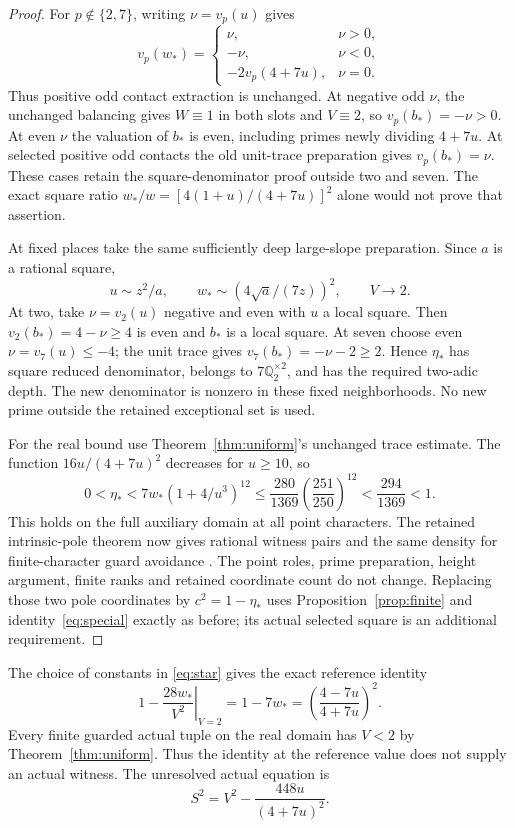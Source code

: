 \documentclass[11pt,a4paper]{article}
\newcommand{\Q}{\mathbb Q}
\begin{document}
\begin{proof}
For $p\notin\{2,7\}$, writing $\nu=v_p(u)$ gives
\[
 v_p(w_*)=\begin{cases}
 \nu,&\nu>0,\\ -\nu,&\nu<0,\\
 -2v_p(4+7u),&\nu=0.
 \end{cases}
\]
Thus positive odd contact extraction is unchanged. At negative odd
$\nu$, the unchanged balancing gives $W\equiv1$ in both slots
and $V\equiv2$, so $v_p(b_*)=-\nu>0$. At even $\nu$ the
valuation of $b_*$ is even, including primes newly dividing $4+7u$.
At selected positive odd contacts the old unit-trace preparation gives
$v_p(b_*)=\nu$. These cases retain the square-denominator proof
outside two and seven. The exact square ratio
$w_*/w=[4(1+u)/(4+7u)]^2$ alone would not prove that assertion.

At fixed places take the same sufficiently deep large-slope preparation.
Since $a$ is a rational square,
\[
 u\sim z^2/a,\qquad w_*\sim(4\sqrt a/(7z))^2,\qquad V\longrightarrow2.
\]
At two, take $\nu=v_2(u)$ negative and even with $u$ a local square.
Then $v_2(b_*)=4-\nu\ge4$ is even and $b_*$ is a local square.
At seven choose even $\nu=v_7(u)\le-4$; the unit trace gives
$v_7(b_*)=-\nu-2\ge2$. Hence $\eta_*$ has square reduced
denominator, belongs to $7\Q_2^{\times2}$, and has the required
two-adic depth. The new denominator is nonzero in these fixed
neighborhoods. No new prime outside the retained exceptional set is used.

For the real bound use Theorem~\ref{thm:uniform}'s unchanged trace estimate.
The function $16u/(4+7u)^2$ decreases for $u\ge10$, so
\[
 0<\eta_*<7w_*(1+4/u^3)^{12}
 \le\frac{280}{1369}\left(\frac{251}{250}\right)^{12}
 <\frac{294}{1369}<1.
\]
This holds on the full auxiliary domain at all point characters.
The retained intrinsic-pole theorem now gives rational witness pairs
and the same density for finite-character guard avoidance
\cite{Intrinsic}. The point roles, prime preparation, height argument,
finite ranks and retained coordinate count do not change.
Replacing those two pole coordinates by $c^2=1-\eta_*$ uses
Proposition~\ref{prop:finite} and identity~\eqref{eq:special} exactly
as before; its actual selected square is an additional requirement.
\end{proof}

The choice of constants in \eqref{eq:star} gives the exact reference identity
\[
 \left.1-\frac{28w_*}{V^2}\right|_{V=2}
 =1-7w_* = \left(\frac{4-7u}{4+7u}\right)^2.
\]
Every finite guarded actual tuple on the real domain has $V<2$ by
Theorem~\ref{thm:uniform}. Thus the identity at the reference value
does not supply an actual witness. The unresolved actual equation is
\[
                         S^2=V^2-\frac{448u}{(4+7u)^2}.
\]
\end{document}
